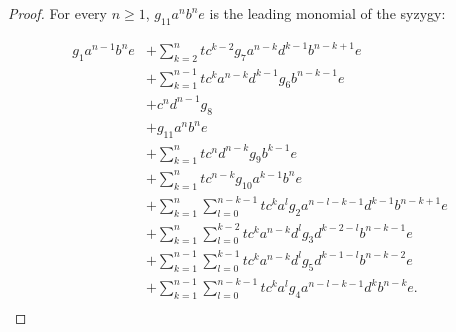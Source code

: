\documentclass[sigconf]{acmart}
\theoremstyle{plain}
\theoremstyle{definition}
\theoremstyle{remark}
\begin{document}
\begin{proof}
  For every $n \geq 1$, $g_{11}a^nb^ne$ is the leading monomial of the syzygy:

  \begin{align*}
    g_1a^{n-1}b^ne & + \sum_{k = 2}^{n} tc^{k - 2}g_7a^{n - k}d^{k - 1}b^{n - k + 1}e \\
    & + \sum_{k = 1}^{n - 1} tc^ka^{n - k}d^{k - 1}g_6b^{n - k - 1}e \\
    & + c^nd^{n - 1}g_8 \\
    & + g_{11}a^nb^ne \\
    & + \sum_{k = 1}^n tc^nd^{n - k}g_9b^{k - 1}e \\
    & + \sum_{k = 1}^n tc^{n - k}g_{10}a^{k - 1}b^ne \\
    & + \sum_{k = 1}^{n} \sum_{l = 0}^{n - k - 1} tc^{k}a^{l}g_2a^{n - l - k - 1}d^{k - 1}b^{n - k + 1} e \\
    & + \sum_{k = 1}^{n} \sum_{l = 0}^{k - 2} tc^{k}a^{n - k}d^lg_3d^{k - 2 - l}b^{n - k - 1}e \\
    & + \sum_{k = 1}^{n - 1} \sum_{l = 0}^{k - 1} tc^{k}a^{n - k}d^lg_5d^{k - 1 - l}b^{n - k - 2}e \\
    & + \sum_{k = 1}^{n - 1} \sum_{l = 0}^{n - k - 1} tc^{k}a^{l}g_4a^{n - l - k - 1}d^{k}b^{n - k} e. \\
  \end{align*}


\end{proof}
\end{document}
